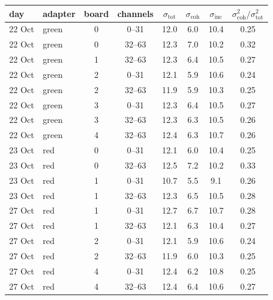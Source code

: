 \begin{tabular}{llcccccc}
\toprule
day & adapter & board & channels & $\sigma_\mathrm{tot}$ & $\sigma_\mathrm{coh}$ & $\sigma_\mathrm{inc}$ & $\sigma_\mathrm{coh}^2/\sigma_\mathrm{tot}^2$ \\
\midrule
22 Oct & green & 0 & 0--31 & 12.0 & 6.0 & 10.4 & 0.25 \\
22 Oct & green & 0 & 32--63 & 12.3 & 7.0 & 10.2 & 0.32 \\
22 Oct & green & 1 & 32--63 & 12.3 & 6.4 & 10.5 & 0.27 \\
22 Oct & green & 2 & 0--31 & 12.1 & 5.9 & 10.6 & 0.24 \\
22 Oct & green & 2 & 32--63 & 11.9 & 5.9 & 10.3 & 0.25 \\
22 Oct & green & 3 & 0--31 & 12.3 & 6.4 & 10.5 & 0.27 \\
22 Oct & green & 3 & 32--63 & 12.3 & 6.3 & 10.5 & 0.26 \\
22 Oct & green & 4 & 32--63 & 12.4 & 6.3 & 10.7 & 0.26 \\
\midrule
23 Oct & red & 0 & 0--31 & 12.1 & 6.0 & 10.4 & 0.25 \\
23 Oct & red & 0 & 32--63 & 12.5 & 7.2 & 10.2 & 0.33 \\
23 Oct & red & 1 & 0--31 & 10.7 & 5.5 & 9.1 & 0.26 \\
23 Oct & red & 1 & 32--63 & 12.3 & 6.5 & 10.5 & 0.28 \\
\midrule
27 Oct & red & 1 & 0--31 & 12.7 & 6.7 & 10.7 & 0.28 \\
27 Oct & red & 1 & 32--63 & 12.1 & 6.3 & 10.4 & 0.27 \\
27 Oct & red & 2 & 0--31 & 12.1 & 5.9 & 10.6 & 0.24 \\
27 Oct & red & 2 & 32--63 & 11.9 & 6.0 & 10.3 & 0.25 \\
27 Oct & red & 4 & 0--31 & 12.4 & 6.2 & 10.8 & 0.25 \\
27 Oct & red & 4 & 32--63 & 12.4 & 6.4 & 10.6 & 0.27 \\
\bottomrule
\end{tabular}
